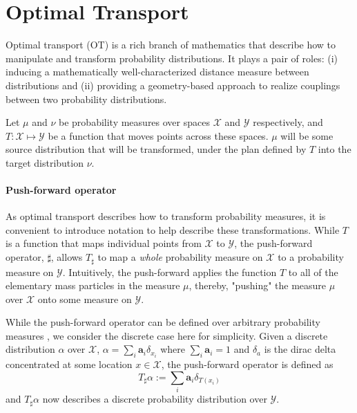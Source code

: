 
\section{Optimal Transport}
Optimal transport (OT) is a rich branch of mathematics that describe how to manipulate and transform probability distributions.
It plays a pair of roles:
(i) inducing a mathematically well-characterized distance measure between distributions
and (ii) providing a geometry-based approach to realize couplings between two probability distributions.

Let $\mu$ and $\nu$ be probability measures over spaces $\mathcal{X}$ and $\mathcal{Y}$ respectively,
and $T : \mathcal{X} \mapsto \mathcal{Y}$ be a function that moves points across these spaces.
$\mu$ will be some source distribution that will be transformed, under the plan defined by $T$ into the target distribution $\nu$.

\paragraph{Push-forward operator}
As optimal transport describes how to transform probability measures,
it is convenient to introduce notation to help describe these transformations.
While $T$ is a function that maps individual points from $\mathcal{X}$ to $\mathcal{Y}$,
the push-forward operator, $\sharp$, allows $T_\sharp$ to
map a \emph{whole} probability measure on $\mathcal{X}$ to a probability measure on $\mathcal{Y}$.
Intuitively, the push-forward applies the function $T$ to all of the elementary mass particles in the measure $\mu$,
thereby, "pushing" the measure $\mu$ over $\mathcal{X}$ onto some measure on $\mathcal{Y}$.

While the push-forward operator can be defined over arbitrary probability measures \cite{villani2009},
we consider the discrete case here for simplicity.
Given a discrete distribution $\alpha$ over $\mathcal{X}$, $\alpha = \sum_i \mathbf{a}_i \delta_{x_i}$
where $\sum_i \mathbf{a}_i = 1$ and $\delta_a$ is the dirac delta concentrated at some location $x \in \mathcal{X}$,
the push-forward operator is defined as 
\begin{equation}
  T_\sharp\alpha := \sum_i \mathbf{a}_i \delta_{T(x_i)}
\end{equation}
and $T_\sharp\alpha$ now describes a discrete probability distribution over $\mathcal{Y}$.

